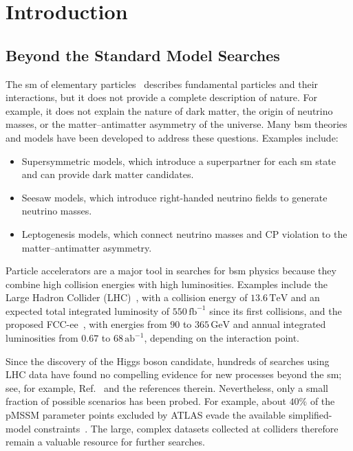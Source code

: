 \documentclass[thesis/Elad_Kliger_Thesis.tex]{subfiles}
\begin{document}
\section{Introduction}

\subsection{Beyond the Standard Model Searches}

The \gls{sm} of elementary particles~\cite{Grossman_StandardModel_2023} describes fundamental particles and their interactions, but it does not provide a complete description of nature. For example, it does not explain the nature of dark matter, the origin of neutrino masses, or the matter--antimatter asymmetry of the universe. Many \gls{bsm} theories and models have been developed to address these questions. Examples include:

\begin{itemize}
    \item Supersymmetric models, which introduce a superpartner for each \gls{sm} state and can provide dark matter candidates.
    \item Seesaw models, which introduce right-handed neutrino fields to generate neutrino masses.
    \item Leptogenesis models, which connect neutrino masses and CP violation to the matter--antimatter asymmetry.
\end{itemize}

Particle accelerators are a major tool in searches for \gls{bsm} physics because they combine high collision energies with high luminosities. Examples include the Large Hadron Collider (LHC)~\cite{CERN_Courier_LHC_Run3}, with a collision energy of $13.6\,\mathrm{TeV}$ and an expected total integrated luminosity of $550\,\mathrm{fb}^{-1}$ since its first collisions, and the proposed FCC-ee~\cite{Benedikt_2026_FCC}, with energies from $90$ to $365\,\mathrm{GeV}$ and annual integrated luminosities from $0.67$ to $68\,\mathrm{ab}^{-1}$, depending on the interaction point.

Since the discovery of the Higgs boson candidate, hundreds of searches using LHC data have found no compelling evidence for new processes beyond the \gls{sm}; see, for example, Ref.~\cite{PDG_2024} and the references therein. Nevertheless, only a small fraction of possible scenarios has been probed. For example, about $40\%$ of the pMSSM parameter points excluded by ATLAS evade the available simplified-model constraints~\cite{Ambrogi_2018_pMSSM_misses}. The large, complex datasets collected at colliders therefore remain a valuable resource for further searches.
\end{document}

